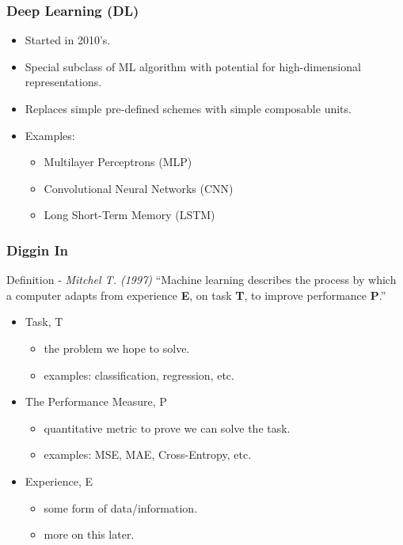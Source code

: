 \documentclass{beamer}
\begin{document}
\begin{frame}

    \frametitle{Deep Learning (DL)}

    \begin{itemize}
        \item Started in 2010's.
        \item Special subclass of ML algorithm with potential for high-dimensional representations.
        \item Replaces simple pre-defined schemes with simple composable units.
        \item Examples:
        \begin{itemize}
            \item Multilayer Perceptrons (MLP)
            \item Convolutional Neural Networks (CNN)
            \item Long Short-Term Memory (LSTM)
        \end{itemize}
    \end{itemize}

\end{frame}

\begin{frame}

    \frametitle{Diggin In}

    \begin{block}{Definition - \textit{Mitchel T. (1997)}}
        ``Machine learning describes the process by which a computer adapts
        from experience \textbf{E}, on task \textbf{T}, to improve
        performance \textbf{P}.''
    \end{block}

    \vskip20pt

    \begin{itemize}
        \item Task, T
        \begin{itemize}
            \item the problem we hope to solve.
            \item examples: classification, regression, etc.
        \end{itemize}
        \item The Performance Measure, P
        \begin{itemize}
            \item quantitative metric to prove we can solve the task.
            \item examples: MSE, MAE, Cross-Entropy, etc. 
        \end{itemize}
        \item Experience, E
            \begin{itemize}
            \item some form of data/information.
            \item more on this later.
        \end{itemize}
    \end{itemize}
    
\end{frame}
\end{document}
